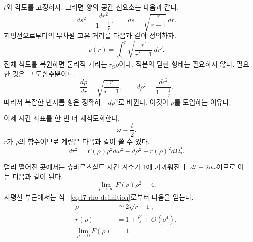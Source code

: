 \(t\)와 각도를 고정하자. 그러면 양의 공간 선요소는 다음과 같다.
\begin{equation}
ds^2=\frac{dr^2}{1-\frac1r},
\qquad
ds=\sqrt{\frac{r}{r-1}}\,dr.
\label{eq:l7-radial-proper-line}
\end{equation}
지평선으로부터의 무차원 고유 거리를 다음과 같이 정의하자.
\begin{equation}
\rho(r)
=
\int_1^r\sqrt{\frac{r'}{r'-1}}\,dr'.
\label{eq:l7-rho-definition}
\end{equation}
전체 척도를 복원하면 물리적 거리는 \(r_{\mathrm S}\rho\)이다. 적분의 닫힌 형태는 필요하지 않다. 필요한 것은 그 도함수뿐이다.
\begin{equation}
\frac{d\rho}{dr}
=\sqrt{\frac{r}{r-1}},
\qquad
d\rho^2
=\frac{dr^2}{1-\frac1r}.
\label{eq:l7-rho-derivative}
\end{equation}
따라서 복잡한 반지름 항은 정확히 \(-d\rho^2\)로 바뀐다. 이것이 \(\rho\)를 도입하는 이유다.

이제 시간 좌표를 한 번 더 재척도화한다.
\begin{equation}
\omega=\frac{t}{2}.
\label{eq:l7-omega}
\end{equation}
\(r\)가 \(\rho\)의 함수이므로 계량은 다음과 같이 쓸 수 있다.
\begin{equation}
d\tau^2
=
F(\rho)\rho^2d\omega^2
-
d\rho^2
-
r(\rho)^2d\Omega_2^2.
\label{eq:l7-rho-metric}
\end{equation}

\begin{classroomqa}
\end{classroomqa}

멀리 떨어진 곳에서는 슈바르츠실트 시간 계수가 1에 가까워진다. \(dt=2d\omega\)이므로 이는 다음과 같이 된다.
\begin{equation}
\lim_{\rho\to\infty}F(\rho)\rho^2=4.
\label{eq:l7-far-limit}
\end{equation}
지평선 부근에서는 식 ~\eqref{eq:l7-rho-definition}로부터 다음을 얻는다.
\begin{equation}
\begin{aligned}
\rho&\simeq 2\sqrt{r-1},\\
r(\rho)&=1+\frac{\rho^2}{4}+O(\rho^4),\\
\lim_{\rho\to0}F(\rho)&=1.
\end{aligned}
\label{eq:l7-near-expansion}
\end{equation}

